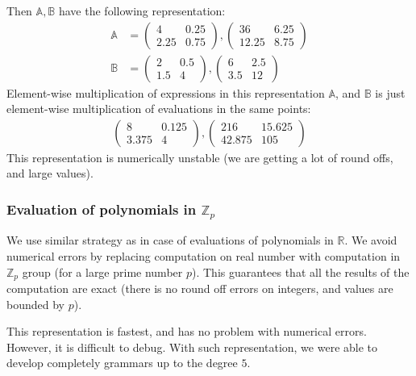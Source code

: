 Then $\mathbb{A}, \mathbb{B}$ have the following representation:
\begin{align*}
\mathbb{A} &= \begin{pmatrix} 4 & 0.25\\ 2.25 & 0.75 \end{pmatrix}, \begin{pmatrix} 36 & 6.25\\ 12.25 & 8.75 \end{pmatrix} \\
\mathbb{B} &= \begin{pmatrix} 2 & 0.5\\ 1.5 & 4 \end{pmatrix}, \begin{pmatrix} 6 & 2.5\\ 3.5 & 12 \end{pmatrix}
\end{align*}
Element-wise multiplication of expressions in this representation $\mathbb{A}$, and $\mathbb{B}$ is just element-wise multiplication of evaluations
in the same points:
\begin{align*}
\begin{pmatrix} 8 & 0.125\\ 3.375 & 4 \end{pmatrix}, \begin{pmatrix} 216 & 15.625\\ 42.875 & 105 \end{pmatrix}
\end{align*}
This representation is numerically unstable (we are getting a lot of round offs, and large values).

\subsubsection{Evaluation of polynomials in $\mathbb{Z}_p$}
We use similar strategy as in case of evaluations of polynomials in $\mathbb{R}$. 
We avoid numerical errors by replacing computation on real number with computation in $\mathbb{Z}_p$ group (for a large prime number $p$). This
guarantees that all the results of the computation are exact (there is no round off errors on integers, and values are bounded by $p$). 

This representation is fastest, and has no problem with numerical errors. However, it is difficult to debug. With such representation, we were able to
develop completely grammars up to the degree $5$.


